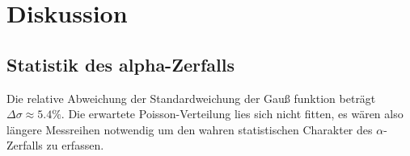 \section{Diskussion}
\label{sec:Diskussion}

\subsection{Statistik des alpha-Zerfalls}
Die relative Abweichung der Standardweichung der Gauß funktion beträgt $\Delta \sigma \approx 5.4\%$. Die erwartete Poisson-Verteilung lies sich nicht fitten, es wären also längere Messreihen notwendig um den wahren statistischen Charakter des $\alpha$-Zerfalls zu erfassen.
